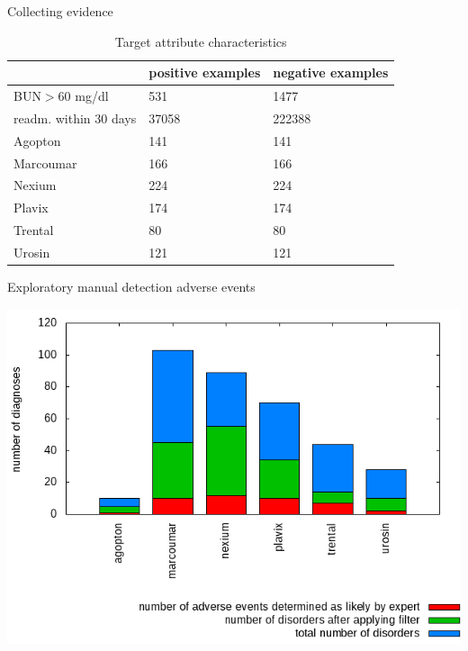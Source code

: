 \message{ !name(presentation.tex)}\documentclass{beamer}
\begin{document}
\begin{frame}{Collecting evidence}
\begin{table}[!ht]  
  \centering
  \begin{tabularx}{\textwidth}{| l | l | X |}
    \cline{2-3}
    \multicolumn{1}{l|}{} 
    & positive examples & negative examples \\ \hline
    BUN$>$60 mg/dl & 531 & 1477 \\
    readm. within 30 days & 37058 & 222388 \\ 
    Agopton & 141 & 141 \\
    Marcoumar & 166 & 166 \\
    Nexium & 224 & 224 \\
    Plavix & 174 & 174 \\
    Trental & 80 & 80 \\
    Urosin & 121 & 121 \\ \hline
  \end{tabularx}
\caption {Target attribute characteristics}
  \label{evidence-table}
\end{table}
\end{frame}

\begin{frame}{Exploratory manual detection adverse events}
\begin{table}[!ht]  
\includegraphics[width=\textwidth,height=.75\textheight,keepaspectratio]{bar_chart_filtered_data}
\end{table}

\end{frame}
\end{document}
